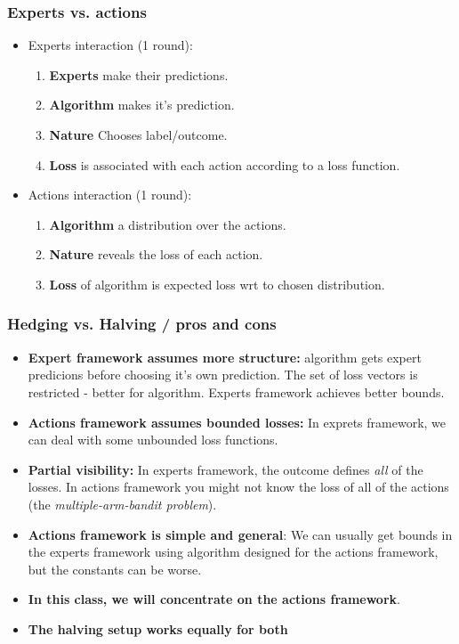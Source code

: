 \documentclass{beamer}
\begin{document}
\begin{frame}
\frametitle{Experts vs. actions}

\begin{itemize}
\item Experts interaction (1 round):
\begin{enumerate}
\item {\bf Experts} make their predictions.
\item {\bf Algorithm} makes it's prediction.
\item {\bf Nature} Chooses label/outcome.
\item {\bf Loss} is associated with each action according to a loss function.
\end{enumerate}

\item Actions interaction (1 round):
\begin{enumerate}
\item {\bf Algorithm} a distribution over the actions.
\item {\bf Nature} reveals the loss of each action.
\item {\bf Loss} of algorithm is expected loss wrt to chosen distribution.
\end{enumerate}
\end{itemize}
\end{frame}

\begin{frame}
\frametitle{Hedging vs. Halving / pros and cons}
\begin{itemize}
\item {\bf Expert framework assumes more structure:}
  algorithm gets expert predicions before choosing it's own
  prediction. The set of loss vectors is restricted - better for
  algorithm. Experts framework achieves better bounds.
\item {\bf Actions framework assumes bounded losses:} In exprets
  framework, we can deal with some unbounded loss functions.
\item {\bf Partial visibility:} In experts framework, the outcome
  defines {\em all} of the losses. In actions framework you might not
  know the loss of all of the actions (the {\em multiple-arm-bandit
    problem}).
\item {\bf Actions framework is simple and general}: We can usually
  get bounds in the experts framework using algorithm designed for the
  actions framework, but the constants can be worse.
\item {\bf In this class, we will concentrate on the actions
  framework}.
\item {\bf The halving setup works equally for both}
\end{itemize}
\end{frame}
\end{document}
